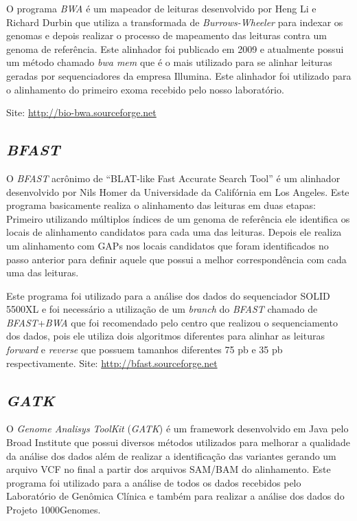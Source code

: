 O programa \textit{BWA} \cite{Li2009a} é um mapeador de leituras desenvolvido por Heng Li e  Richard Durbin que utiliza a transformada de \textit{Burrows-Wheeler} para indexar os genomas e depois realizar o processo de mapeamento das leituras contra um genoma de referência. Este alinhador foi publicado em 2009 e atualmente possui um método chamado \textit{bwa mem} que é o mais utilizado para se alinhar leituras geradas por sequenciadores da empresa Illumina. Este alinhador foi utilizado para o alinhamento do primeiro exoma recebido pelo nosso laboratório.

\noindent
Site: \url{http://bio-bwa.sourceforge.net}

\subsection{\textit{BFAST}}
O \textit{BFAST} \cite{Homer2009} acrônimo de ``BLAT-like Fast Accurate Search Tool'' é um alinhador desenvolvido por Nils Homer da Universidade da Califórnia em Los Angeles. Este programa basicamente realiza o alinhamento das leituras em duas etapas: Primeiro utilizando múltiplos índices de um genoma de referência ele identifica os locais de alinhamento candidatos para cada uma das leituras. Depois ele realiza um alinhamento com GAPs nos locais candidatos que foram identificados no passo anterior para definir aquele que possui a melhor correspondência com cada uma das leituras.

Este programa foi utilizado para a análise dos dados do sequenciador SOLID 5500XL e foi necessário a utilização de um \textit{branch} do \textit{BFAST} chamado de \textit{BFAST}+\textit{BWA} que foi recomendado pelo centro que realizou o sequenciamento dos dados, pois ele utiliza dois algoritmos diferentes para alinhar as leituras \textit{forward} e \textit{reverse} que possuem tamanhos diferentes 75 pb e 35 pb respectivamente.
\noindent
Site: \url{http://bfast.sourceforge.net}

\subsection{\textit{GATK}}

O \textit{Genome Analisys ToolKit} (\textit{GATK}) \cite{DePristo2011}  é um framework desenvolvido em Java pelo Broad Institute que possui diversos métodos utilizados para melhorar a qualidade da análise dos dados além de realizar a identificação das variantes gerando um arquivo VCF no final a partir dos arquivos SAM/BAM do alinhamento. Este programa foi utilizado para a análise de todos os dados recebidos pelo Laboratório de Genômica Clínica e também para realizar a análise dos dados do Projeto 1000Genomes. 

